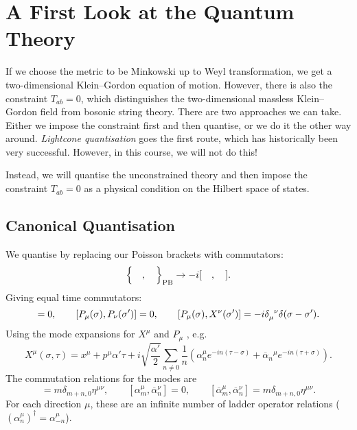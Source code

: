 
\section{A First Look at the Quantum Theory}%
\label{sec:a_first_look_at_the_quantum_theory}

If we choose the metric to be Minkowski up to Weyl transformation, we get a two-dimensional Klein--Gordon equation of motion.
However, there is also the constraint $T_{ab} = 0$, which distinguishes the two-dimensional massless Klein--Gordon field from bosonic string theory.
There are two approaches we can take.
Either we impose the constraint first and then quantise, or we do it the other way around.
\emph{Lightcone quantisation} goes the first route, which has historically been very successful.
However, in this course, we will not do this!

Instead, we will quantise the unconstrained theory and then impose the constraint $T_{ab} = 0$ as a physical condition  on the Hilbert space of states.

\subsection{Canonical Quantisation}%
\label{sub:canonical_quantisation}

We quantise by replacing our Poisson brackets with commutators:
\begin{equation}
  \Bigl\{ \quad , \quad \Bigr\}_{\text{PB}} \to -i [\quad , \quad ].
\end{equation}
Giving equal time commutators:
\begin{equation}
  [X^{\mu}(\sigma), X^{\nu}(\sigma')] = 0, \qquad [P_{\mu}(\sigma), P_{\nu}(\sigma')] = 0, \qquad [P_{\mu}(\sigma), X^{\nu}(\sigma')] = -i \delta\indices{_{\mu}^{\nu}} \delta(\sigma - \sigma').
\end{equation}
Using the mode expansions for $X^{\mu}$  and $P_{\mu}$ , e.g.
\begin{equation}
  X^{\mu}(\sigma, \tau) = x^{\mu} + p^{\mu} \alpha' \tau + i \sqrt{\frac{\alpha'}{2}} \sum_{n \neq 0} \frac{1}{n}\left( \alpha_n^{\mu} e^{-in (\tau - \sigma)} + \overline{\alpha}_n{}^{\mu} e^{-in (\tau + \sigma)} \right).
\end{equation}
The commutation relations for the modes are
\begin{equation}
  [\alpha^{\mu}_m, \alpha^{\nu}_n] = m \delta_{m + n, 0} \eta^{\mu\nu}, \qquad
  [\alpha^{\mu}_m, \overline{\alpha}^{\nu}_n] = 0, \qquad
  [\overline{\alpha}^{\mu}_m, \overline{\alpha}^{\nu}_n] = m \delta_{m + n, 0} \eta^{\mu\nu}.
\end{equation}
For each direction $\mu$, these are an infinite number of ladder operator relations ($(\alpha_n^{\mu})^{\dagger} = \alpha^{\mu}_{-n}$).

